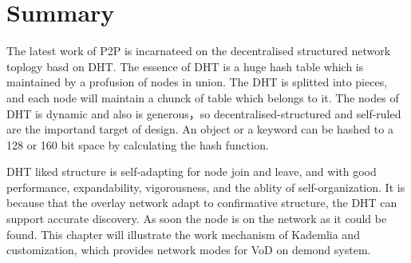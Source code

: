\section{Summary}
{
The latest work of P2P is incarnateed on the decentralised structured network toplogy basd on DHT.
The essence of DHT is a huge hash table which is maintained by a profusion of nodes in union.
The DHT is splitted into pieces, and each node will maintain a chunck of table which belongs to it.
The nodes of DHT is dynamic and also is generous，so decentralised-structured and self-ruled are the importand target of design.
An object or a keyword can be hashed to a 128 or 160 bit space by calculating the hash function.

DHT liked structure is self-adapting for node join and leave, and with good performance, expandability, vigorousness, and the ablity of self-organization.
It is because that the overlay network adapt to confirmative structure, the DHT can support accurate discovery.
As soon the node is on the network as it could be found.
This chapter will illustrate the work mechanism of Kademlia and customization, which provides network modes for VoD on demond system.

}

